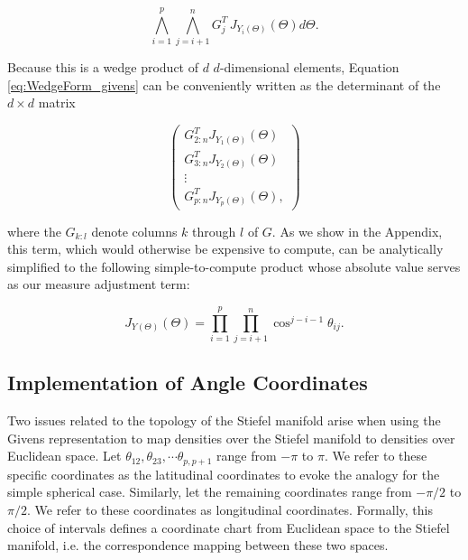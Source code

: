 \documentclass[ba]{imsart}
\numberwithin{equation}{section}
\theoremstyle{plain}
\begin{document}
\begin{equation}
\label{eq:WedgeForm_givens}
\bigwedge_{i=1}^p \bigwedge_{j=i+1}^n G_j^T\, J_{Y_i(\Theta)}(\Theta) d\Theta.
\end{equation}

\noindent Because this is a wedge product of $d$ $d$-dimensional elements, Equation \ref{eq:WedgeForm_givens} can be conveniently written as the determinant of the $d \times d$ matrix

\begin{equation}
\label{eq:measure_matrix_form}
\begin{pmatrix}
G_{2:n}^T J_{Y_1(\Theta)}(\Theta)\\
G_{3:n}^T J_{Y_2(\Theta)}(\Theta)\\
\vdots\\
G_{p:n}^T J_{Y_p(\Theta)}(\Theta),
\end{pmatrix}
\end{equation}

\noindent where the $G_{k:l}$ denote columns $k$ through $l$ of $G$. As we show in the Appendix, this term, which would otherwise be expensive to compute, can be analytically simplified to the following simple-to-compute product whose absolute value serves as our measure adjustment term:

\begin{equation}
\label{eq:final_change_of_measure}
J_{Y(\Theta)}(\Theta) = \prod_{i=1}^p \prod_{j=i+1}^n \cos^{j-i-1} \theta_{ij}.
\end{equation}

\subsection{Implementation of Angle Coordinates}
Two issues related to the topology of the Stiefel manifold arise when using the Givens representation to map densities over the Stiefel manifold to densities over Euclidean space. Let $\theta_{12}, \theta_{23}, \cdots \theta_{p,p+1}$ range from $-\pi$ to $\pi$. We refer to these specific coordinates as the latitudinal coordinates to evoke the analogy for the simple spherical case. Similarly, let the remaining coordinates range from $-\pi/2$ to $\pi/2$. We refer to these coordinates as longitudinal coordinates. Formally, this choice of intervals defines a coordinate chart from Euclidean space to the Stiefel manifold, i.e. the correspondence mapping between these two spaces.
\end{document}
